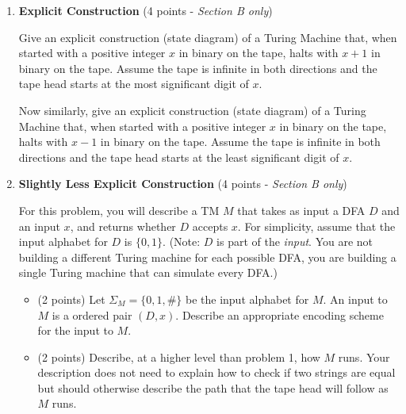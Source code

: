 \documentclass[11pt]{article}
\begin{document}
\begin{enumerate}
    
\item \textbf{Explicit Construction} (4 points - \textit{Section B only})

Give an explicit construction (state diagram) of a Turing Machine that, when started with a positive integer $x$ in binary on the tape, halts with $x+1$ in binary on the tape. Assume the tape is infinite in both directions and the tape head starts at the most significant digit of $x$.\\

\begin{answer}
\end{answer}

Now similarly, give an explicit construction (state diagram) of a Turing Machine that, when started with a positive integer $x$ in binary on the tape, halts with $x-1$ in binary on the tape. Assume the tape is infinite in both directions and the tape head starts at the least significant digit of $x$.\\

\begin{answer}
\end{answer}  
\item \textbf{Slightly Less Explicit Construction} (4 points - \textit{Section B only})

 For this problem, you will describe a TM $M$ that takes as input a DFA $D$ and an input $x$, and returns whether $D$ accepts $x$. For simplicity, assume that the input alphabet for $D$ is $\{0,1\}$. (Note: $D$ is part of the \textit{input}. You are not building a different Turing machine for each possible DFA, you are building a single Turing machine that can simulate every DFA.)
 
 \begin{itemize}
     \item (2 points) Let $\Sigma_M = \{0,1,\#\}$ be the input alphabet for $M$. An input to $M$ is a ordered pair $(D,x)$.  Describe an appropriate encoding scheme for the input to $M$. \\
     
     \begin{answer}
     \end{answer}

     
     \item (2 points) Describe, at a higher level than problem 1, how $M$ runs.  Your description does not need to explain how to check if two strings are equal but should otherwise describe the path that the tape head will follow as $M$ runs. \\


\end{itemize}
\end{enumerate}
\end{document}
